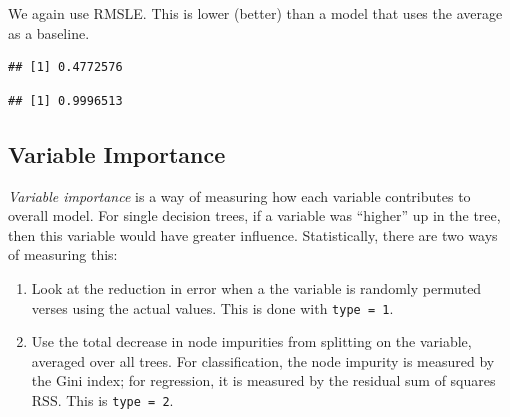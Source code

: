 \documentclass[openany]{book}
\newenvironment{Shaded}{\begin{snugshade}}{\end{snugshade}}
\newcommand{\ControlFlowTok}[1]{\textcolor[rgb]{0.13,0.29,0.53}{\textbf{#1}}}
\newcommand{\DecValTok}[1]{\textcolor[rgb]{0.00,0.00,0.81}{#1}}
\newcommand{\KeywordTok}[1]{\textcolor[rgb]{0.13,0.29,0.53}{\textbf{#1}}}
\newcommand{\NormalTok}[1]{#1}
\newcommand{\OperatorTok}[1]{\textcolor[rgb]{0.81,0.36,0.00}{\textbf{#1}}}
\newcommand{\StringTok}[1]{\textcolor[rgb]{0.31,0.60,0.02}{#1}}
\begin{document}
We again use RMSLE. This is lower (better) than a model that uses the average as a baseline.

\begin{Shaded}
\end{Shaded}

\begin{verbatim}
## [1] 0.4772576
\end{verbatim}

\begin{Shaded}
\end{Shaded}

\begin{verbatim}
## [1] 0.9996513
\end{verbatim}

\hypertarget{variable-importance}{%
\subsection{Variable Importance}\label{variable-importance}}

\emph{Variable importance} is a way of measuring how each variable contributes to overall model. For single decision trees, if a variable was ``higher'' up in the tree, then this variable would have greater influence. Statistically, there are two ways of measuring this:

\begin{enumerate}
\def\labelenumi{\arabic{enumi})}
\item
  Look at the reduction in error when a the variable is randomly permuted verses using the actual values. This is done with \texttt{type\ =\ 1}.
\item
  Use the total decrease in node impurities from splitting on the variable, averaged over all trees. For classification, the node impurity is measured by the Gini index; for regression, it is measured by the residual sum of squares \(\text{RSS}\). This is \texttt{type\ =\ 2}.
\end{enumerate}
\end{document}
